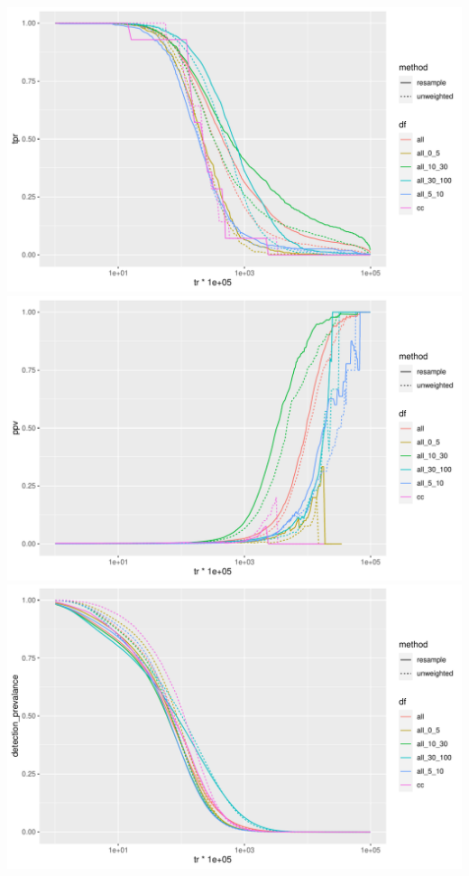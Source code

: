 \documentclass[12pt]{article}
\begin{document}
\newpage
\begin{center}
\includegraphics[width=.7\textwidth]{all_tpr_missing.pdf}
\includegraphics[width=.7\textwidth]{all_ppv_missing.pdf}
\includegraphics[width=.7\textwidth]{all_dp_missing.pdf}
\end{center}
\end{document}
